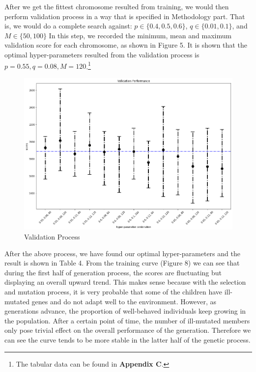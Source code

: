 \documentclass[letterpaper]{article} %
\begin{document}
\begin{itemize}
  After we get the fittest chromosome resulted from training, we would then perform validation process in a way that is specified in Methodology part. That is, we would do a complete search against:
    $p\in\{0.4,0.5,0.6\}$, 
    $q \in \{0.01, 0.1\}$, and
    $M \in \{50, 100\}$
  In this step, we recorded the minimum, mean and maximum validation score for each chromosome, as shown in Figure 5. It is shown that the optimal hyper-parameters resulted from the validation process is ${p = 0.55, q = 0.08, M = 120}$.\footnote{The tabular data can be found in \textbf{Appendix C}.}
  \begin{figure}[h!]
    \centering
    \includegraphics[width=0.9\linewidth]{figures/GA2}
    \caption{Validation Process}
    \label{fig:ga2}
  \end{figure}
  
  After the above process, we have found our optimal hyper-parameters and the result is shown in Table 4. From the training curve (Figure 8) we can see that during the first half of generation process, the scores are fluctuating but displaying an overall upward trend. This makes sense because with the selection and mutation process, it is very probable that some of the children have ill-mutated genes and do not adapt well to the environment. However, as generations advance, the proportion of well-behaved individuals keep growing in the population. After a certain point of time, the number of ill-mutated members only pose trivial effect on the overall performance of the generation. Therefore we can see the curve tends to be more stable in the latter half of the genetic process. 
  

\end{itemize}
\end{document}
